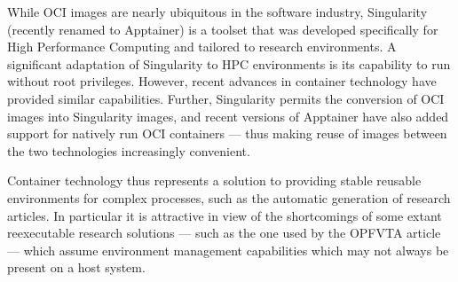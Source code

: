 While OCI images are nearly ubiquitous in the software industry, Singularity (recently renamed to Apptainer) is a toolset that was developed specifically for High Performance Computing and tailored to research environments.
A significant adaptation of Singularity to HPC environments is its capability to run without root privileges.
However, recent advances in container technology have provided similar capabilities.
Further, Singularity permits the conversion of OCI images into Singularity images, and recent versions of Apptainer have also added support for natively run OCI containers — thus making reuse of images between the two technologies increasingly convenient.


Container technology thus represents a solution to providing stable reusable environments for complex processes, such as the automatic generation of research articles.
In particular it is attractive in view of the shortcomings of some extant reexecutable research solutions — such as the one used by the OPFVTA article — which assume environment management capabilities which may not always be present on a host system.
